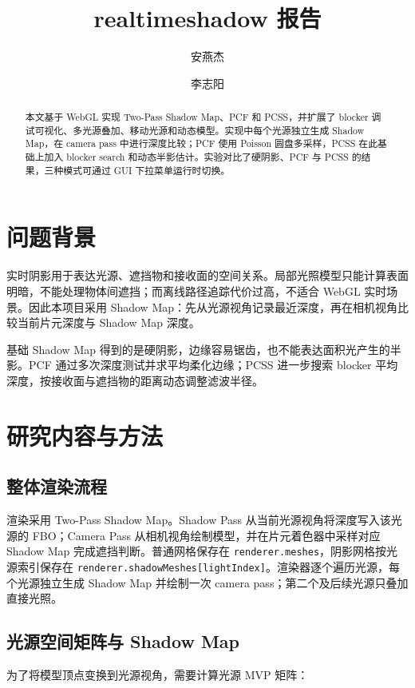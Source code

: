 \documentclass{sjtuarticle}
\title{realtimeshadow 报告}
\author{安燕杰  \and  李志阳}
\begin{document}
\maketitle

\begin{abstract}
本文基于 WebGL 实现 Two-Pass Shadow Map、PCF 和 PCSS，并扩展了 blocker 调试可视化、多光源叠加、移动光源和动态模型。实现中每个光源独立生成 Shadow Map，在 camera pass 中进行深度比较；PCF 使用 Poisson 圆盘多采样，PCSS 在此基础上加入 blocker search 和动态半影估计。实验对比了硬阴影、PCF 与 PCSS 的结果，三种模式可通过 GUI 下拉菜单运行时切换。
\end{abstract}

\section{问题背景}

实时阴影用于表达光源、遮挡物和接收面的空间关系。局部光照模型只能计算表面明暗，不能处理物体间遮挡；而离线路径追踪代价过高，不适合 WebGL 实时场景。因此本项目采用 Shadow Map：先从光源视角记录最近深度，再在相机视角比较当前片元深度与 Shadow Map 深度。

基础 Shadow Map 得到的是硬阴影，边缘容易锯齿，也不能表达面积光产生的半影。PCF 通过多次深度测试并求平均柔化边缘；PCSS 进一步搜索 blocker 平均深度，按接收面与遮挡物的距离动态调整滤波半径。

\section{研究内容与方法}

\subsection{整体渲染流程}

渲染采用 Two-Pass Shadow Map。Shadow Pass 从当前光源视角将深度写入该光源的 FBO；Camera Pass 从相机视角绘制模型，并在片元着色器中采样对应 Shadow Map 完成遮挡判断。普通网格保存在 \texttt{renderer.meshes}，阴影网格按光源索引保存在 \texttt{renderer.shadowMeshes[lightIndex]}。渲染器逐个遍历光源，每个光源独立生成 Shadow Map 并绘制一次 camera pass；第二个及后续光源只叠加直接光照。

\subsection{光源空间矩阵与 Shadow Map}

为了将模型顶点变换到光源视角，需要计算光源 MVP 矩阵：
\end{document}
